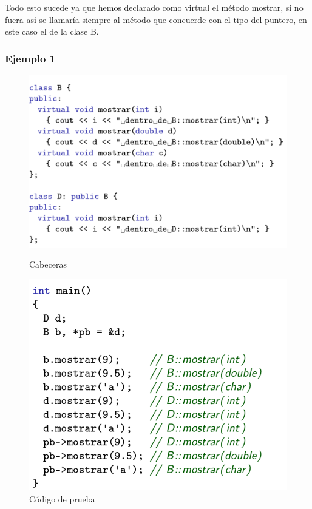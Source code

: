Todo esto sucede ya que hemos declarado como virtual el método mostrar, si no fuera así se llamaría siempre al método que concuerde con el tipo del puntero, en este caso el de la clase B.

\subsubsection{Ejemplo 1}

\begin{figure}[h]
	\begin{minipage}[t]{0.5\textwidth}
		\includegraphics[width=\textwidth]{Imagenes/pol3.png}
		\caption{Cabeceras}
	\end{minipage}
	\hfill
	\begin{minipage}[t]{0.5\textwidth}
		\includegraphics[width=\textwidth]{Imagenes/pol4.png}
		\caption{Código de prueba}
	\end{minipage}
\end{figure}

